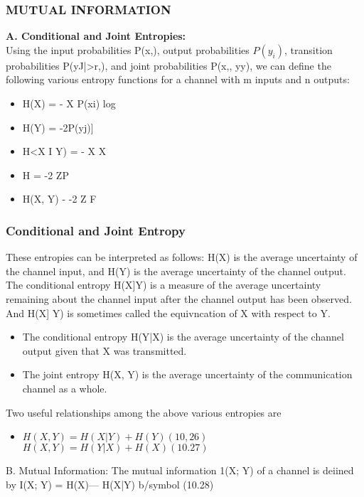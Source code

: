 \documentclass[a4]{beamer}
\begin{document}
\begin{frame}
\frametitle{ MUTUAL INFORMATION}
\textbf{A. Conditional and Joint Entropies:}\\
Using the input probabilities P(x,), output probabilities $P(y_i)$, transition probabilities P(yJ|>r,),
and joint probabilities P(x,, yy), we can define the following various entropy functions for a channel
with m inputs and n outputs:
 
\begin{itemize}
\item H(X) = - X P(xi) log %
\item H(Y) = -2P(yj)]%
\item H<X I Y) = - X X %
\item H = -2 ZP%
\item H(X, Y) - -2 Z F%
\end{itemize}
\end{frame}

\begin{frame}
\frametitle{Conditional and Joint Entropy}
These entropies can be interpreted as follows: H(X) is the average uncertainty of the channel input,
and H(Y) is the average uncertainty of the channel output. The conditional entropy H(X]Y) is a
measure of the average uncertainty remaining about the channel input after the channel output has
been observed. And H(X] Y) is sometimes called the equivncation of X with respect to Y. \begin{itemize} \item The
conditional entropy H(Y|X) is the average uncertainty of the channel output given that X was
transmitted.\item  The joint entropy H(X, Y) is the average uncertainty of the communication channel as a
whole.\end{itemize}
\end{frame}
\begin{frame}
Two useful relationships among the above various entropies are
\begin{itemize} \item
$H(X, Y)=H(X|Y)+H(Y) (10,26)$
$H(X,Y)=H(Y|X)+H(X) (10.27)$
\end{itemize}
B. Mutual Information:
The mutual information 1(X; Y) of a channel is deiined by
I(X; Y) = H(X)— H(X|Y) b/symbol (10.28)
\end{frame}
\end{document}

